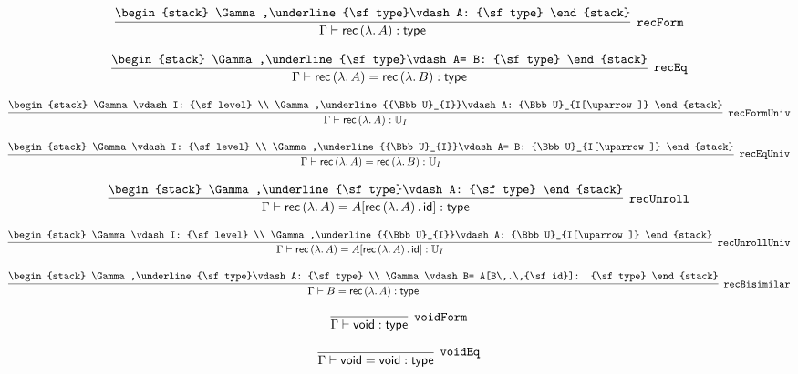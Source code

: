 \[
\infer[{\tt recForm}]{\Gamma \vdash {\sf rec}\,(\lambda .\,A): {\sf type}}{
\begin{stack}
\Gamma ,\underline{\sf type}\vdash A: {\sf type}
\end{stack}}
\]

\[
\infer[{\tt recEq}]{\Gamma \vdash {\sf rec}\,(\lambda .\,A)= {\sf rec}\,(\lambda .\,B): {\sf type}}{
\begin{stack}
\Gamma ,\underline{\sf type}\vdash A= B: {\sf type}
\end{stack}}
\]

\[
\infer[{\tt recFormUniv}]{\Gamma \vdash {\sf rec}\,(\lambda .\,A): {\Bbb U}_{I}}{
\begin{stack}
\Gamma \vdash I: {\sf level}
\\
\Gamma ,\underline{{\Bbb U}_{I}}\vdash A: {\Bbb U}_{I[\uparrow ]}
\end{stack}}
\]

\[
\infer[{\tt recEqUniv}]{\Gamma \vdash {\sf rec}\,(\lambda .\,A)= {\sf rec}\,(\lambda .\,B): {\Bbb U}_{I}}{
\begin{stack}
\Gamma \vdash I: {\sf level}
\\
\Gamma ,\underline{{\Bbb U}_{I}}\vdash A= B: {\Bbb U}_{I[\uparrow ]}
\end{stack}}
\]

\[
\infer[{\tt recUnroll}]{\Gamma \vdash {\sf rec}\,(\lambda .\,A)= A[{\sf rec}\,(\lambda .\,A)\,.\,{\sf id}]: {\sf type}}{
\begin{stack}
\Gamma ,\underline{\sf type}\vdash A: {\sf type}
\end{stack}}
\]

\[
\infer[{\tt recUnrollUniv}]{\Gamma \vdash {\sf rec}\,(\lambda .\,A)= A[{\sf rec}\,(\lambda .\,A)\,.\,{\sf id}]: {\Bbb U}_{I}}{
\begin{stack}
\Gamma \vdash I: {\sf level}
\\
\Gamma ,\underline{{\Bbb U}_{I}}\vdash A: {\Bbb U}_{I[\uparrow ]}
\end{stack}}
\]

\[
\infer[{\tt recBisimilar}]{\Gamma \vdash B= {\sf rec}\,(\lambda .\,A): {\sf type}}{
\begin{stack}
\Gamma ,\underline{\sf type}\vdash A: {\sf type}
\\
\Gamma \vdash B= A[B\,.\,{\sf id}]: {\sf type}
\end{stack}}
\]

\[
\infer[{\tt voidForm}]{\Gamma \vdash {\sf void}: {\sf type}}{}
\]

\[
\infer[{\tt voidEq}]{\Gamma \vdash {\sf void}= {\sf void}: {\sf type}}{}
\]

